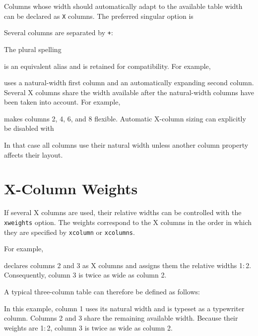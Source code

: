 \documentclass[
11pt,
a4paper,
oneside
]{scrbook}
\begin{document}
Columns whose width should automatically adapt to the available table width
can be declared as \texttt{X} columns.
The preferred singular option is





Several columns are separated by \texttt{+}:




The plural spelling




is an equivalent alias and is retained for compatibility.
For example,




uses a natural-width first column and an automatically expanding second
column.
Several X columns share the width available after the natural-width columns
have been taken into account. For example,




makes columns 2, 4, 6, and 8 flexible.
Automatic X-column sizing can explicitly be disabled with




In that case all columns use their natural width unless another column
property affects their layout.

\section{X-Column Weights}

If several X columns are used, their relative widths can be controlled with
the \texttt{xweights} option. The weights correspond to the X columns in the
order in which they are specified by \texttt{xcolumn} or \texttt{xcolumns}.

For example,




declares columns 2 and 3 as X columns and assigns them the relative widths
1:\,2. Consequently, column 3 is twice as wide as column 2.

A typical three-column table can therefore be defined as follows:




In this example, column 1 uses its natural width and is typeset as a
typewriter column. Columns 2 and 3 share the remaining available width.
Because their weights are 1:\,2, column 3 is twice as wide as
column 2.
\end{document}
